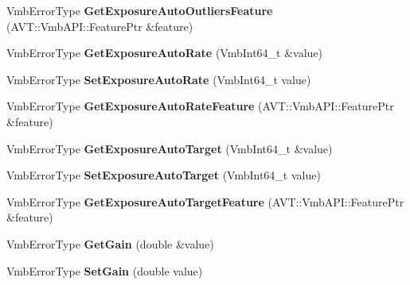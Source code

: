 \begin{DoxyCompactItemize}
\item 
\hypertarget{classMakoCamera_a44081c12088a441a2ea2d9f1e13b9db5}{Vmb\-Error\-Type {\bfseries Get\-Exposure\-Auto\-Outliers\-Feature} (A\-V\-T\-::\-Vmb\-A\-P\-I\-::\-Feature\-Ptr \&feature)}\label{classMakoCamera_a44081c12088a441a2ea2d9f1e13b9db5}

\item 
\hypertarget{classMakoCamera_a552caa145e27932f98347c874f2b0527}{Vmb\-Error\-Type {\bfseries Get\-Exposure\-Auto\-Rate} (Vmb\-Int64\-\_\-t \&value)}\label{classMakoCamera_a552caa145e27932f98347c874f2b0527}

\item 
\hypertarget{classMakoCamera_ae789c94da4567ed53ae2af52fa38b6b3}{Vmb\-Error\-Type {\bfseries Set\-Exposure\-Auto\-Rate} (Vmb\-Int64\-\_\-t value)}\label{classMakoCamera_ae789c94da4567ed53ae2af52fa38b6b3}

\item 
\hypertarget{classMakoCamera_a0b91e3078164c723c6f0fced97daac1c}{Vmb\-Error\-Type {\bfseries Get\-Exposure\-Auto\-Rate\-Feature} (A\-V\-T\-::\-Vmb\-A\-P\-I\-::\-Feature\-Ptr \&feature)}\label{classMakoCamera_a0b91e3078164c723c6f0fced97daac1c}

\item 
\hypertarget{classMakoCamera_a5cf461bcfd3dd2aacf6469f3df3c9c26}{Vmb\-Error\-Type {\bfseries Get\-Exposure\-Auto\-Target} (Vmb\-Int64\-\_\-t \&value)}\label{classMakoCamera_a5cf461bcfd3dd2aacf6469f3df3c9c26}

\item 
\hypertarget{classMakoCamera_ae18419f022c8d86e2845e576abce27f5}{Vmb\-Error\-Type {\bfseries Set\-Exposure\-Auto\-Target} (Vmb\-Int64\-\_\-t value)}\label{classMakoCamera_ae18419f022c8d86e2845e576abce27f5}

\item 
\hypertarget{classMakoCamera_a09326ed9f55a40121b36a21ce82bc5eb}{Vmb\-Error\-Type {\bfseries Get\-Exposure\-Auto\-Target\-Feature} (A\-V\-T\-::\-Vmb\-A\-P\-I\-::\-Feature\-Ptr \&feature)}\label{classMakoCamera_a09326ed9f55a40121b36a21ce82bc5eb}

\item 
\hypertarget{classMakoCamera_adb509477f8c9e6cca9aa98a636886b04}{Vmb\-Error\-Type {\bfseries Get\-Gain} (double \&value)}\label{classMakoCamera_adb509477f8c9e6cca9aa98a636886b04}

\item 
\hypertarget{classMakoCamera_a6431932153d74bd966eae0af2c30e244}{Vmb\-Error\-Type {\bfseries Set\-Gain} (double value)}\label{classMakoCamera_a6431932153d74bd966eae0af2c30e244}


\end{DoxyCompactItemize}
